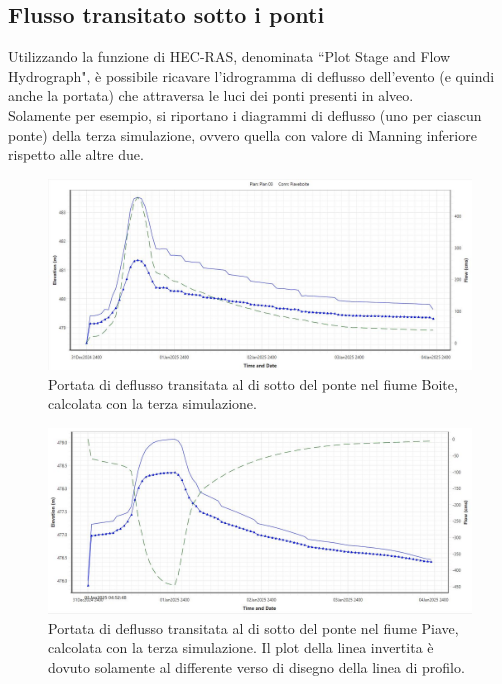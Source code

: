 \subsection{Flusso transitato sotto i ponti}
Utilizzando la funzione di HEC-RAS, denominata ``Plot Stage and Flow Hydrograph", è possibile ricavare l'idrogramma di deflusso dell'evento (e quindi anche la portata) che attraversa le luci dei ponti presenti in alveo.\\
Solamente per esempio, si riportano i diagrammi di deflusso (uno per ciascun ponte) della terza simulazione, ovvero quella con valore di Manning inferiore rispetto alle altre due. 
\begin{figure}[H] \centering
    \includegraphics[scale=0.5]{immagini/flow_ponte_boite.JPG}
    \caption{Portata di deflusso transitata al di sotto del ponte nel fiume Boite, calcolata con la terza simulazione.}
    \label{figure:flow_ponte_boite}
\end{figure}
\begin{figure}[H] \centering
    \includegraphics[scale=0.5]{immagini/flow_ponte_piave.JPG}
    \caption{Portata di deflusso transitata al di sotto del ponte nel fiume Piave, calcolata con la terza simulazione. Il plot della linea invertita è dovuto solamente al differente verso di disegno della linea di profilo.}
    \label{figure:flow_ponte_piave}
\end{figure}

